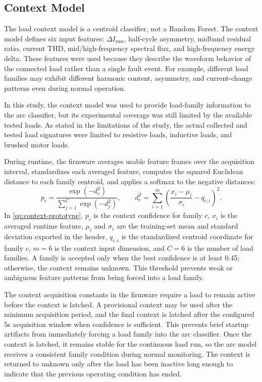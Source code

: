 \subsection{Context Model}
\label{sec:ch3-context-model}

The load context model is a centroid classifier, not a
Random Forest. The context model defines six input features:
$\Delta I_{\mathrm{rms}}$, half-cycle asymmetry, midband residual
ratio, current THD, mid/high-frequency spectral flux, and high-frequency
energy delta. These features were used because they describe the waveform
behavior of the connected load rather than a single fault event.
For example, different load families may exhibit different harmonic content,
asymmetry, and current-change patterns even during normal operation.

In this study, the context model was used to provide load-family information
to the arc classifier, but its experimental coverage was still limited by the
available tested loads. As stated in the limitations of the study, the actual
collected and tested load signatures were limited to resistive loads,
inductive loads, and brushed motor loads.

During runtime, the firmware averages usable feature frames over the
acquisition interval, standardizes each averaged feature, computes the
squared Euclidean distance to each family centroid, and applies a softmax to
the negative distances:
\begin{equation}
  p_c =
  \frac{\exp(-d_c^2)}
       {\sum_{j=1}^{C}\exp(-d_j^2)},
  \qquad
  d_c^2 = \sum_{i=1}^{m}
  \left(\frac{x_i-\mu_i}{\sigma_i}-q_{c,i}\right)^2 .
  \label{eq:context-prototype}
\end{equation}
In \eqref{eq:context-prototype}, $p_c$ is the context confidence for family
$c$, $x_i$ is the averaged runtime feature, $\mu_i$ and $\sigma_i$ are the
training-set mean and standard deviation exported in the header, $q_{c,i}$ is
the standardized centroid coordinate for family $c$, $m=6$ is the context
input dimension, and $C=6$ is the number of load families. A family is accepted
only when the best confidence is at least 0.45; otherwise, the context remains
unknown. This threshold prevents weak or ambiguous feature patterns from being
forced into a load family.

The context acquisition constants in the firmware require a load to remain
active before the context is latched. A provisional context may be used after
the minimum acquisition period, and the final context is latched after the
configured 5s acquisition window when confidence is sufficient. This prevents
brief startup artifacts from immediately forcing a load family into the arc
classifier. Once the context is latched, it remains stable for the continuous
load run, so the arc model receives a consistent family condition during
normal monitoring. The context is returned to unknown only after the load has
been inactive long enough to indicate that the previous operating condition
has ended.

